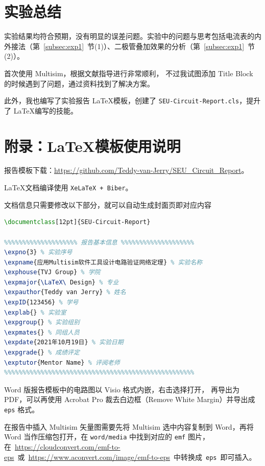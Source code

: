 \documentclass[12pt]{SEU-Circuit-Report}
\begin{document}
    \newpage

    \section{实验总结}

        实验结果均符合预期，没有明显的误差问题。实验中的问题与思考包括电流表的内外接法（第~\ref{subsec:exp1}~节(1)）、二极管叠加效果的分析（第~\ref{subsec:exp1}~节(2)）。

        首次使用 Multisim，根据文献\cite{teaching_schedule}指导进行非常顺利，
        不过我试图添加 Title Block 的时候遇到了问题，通过资料\cite{multisim_help}找到了解决方案。

        此外，我也编写了实验报告 \LaTeX 模板，创建了 \texttt{SEU-Circuit-Report.cls}，提升了 \LaTeX 编写的技能。

    \printbibliography

    \newpage

    \section*{附录：\LaTeX 模板使用说明}

        报告模板下载：\url{https://github.com/Teddy-van-Jerry/SEU_Circuit_Report}。

        \LaTeX 文档编译使用 \texttt{XeLaTeX + Biber}。

        文档信息只需要修改以下部分，就可以自动生成封面页即对应内容

        \begin{lstlisting}[language=TeX]
%% 使用实验报告模板类（字体大小 12pt 最适合）
\documentclass[12pt]{SEU-Circuit-Report}

%%%%%%%%%%%%%%%%%%%% 报告基本信息 %%%%%%%%%%%%%%%%%%%%
\expno{3} % 实验序号
\expname{应用Multisim软件工具设计电路验证网络定理} % 实验名称
\exphouse{TVJ Group} % 学院
\expmajor{\LaTeX\ Design} % 专业
\expauthor{Teddy van Jerry} % 姓名
\expID{123456} % 学号
\explab{} % 实验室
\expgroup{} % 实验组别
\expmates{} % 同组人员
\expdate{2021年10月19日} % 实验日期
\expgrade{} % 成绩评定
\exptutor{Mentor Name} % 评阅老师
%%%%%%%%%%%%%%%%%%%%%%%%%%%%%%%%%%%%%%%%%%%%%%%%%%%%
        \end{lstlisting}

        Word 版报告模板中的电路图以 Visio 格式内嵌，右击选择打开，
        再导出为 PDF，可以再使用 Acrobat Pro 裁去白边框（Remove White Margin）并导出成 \texttt{eps} 格式。

        在报告中插入 Multisim 矢量图需要先将 Multisim 选中内容复制到 Word，再将 Word 当作压缩包打开，在 \texttt{word/media} 中找到对应的 \texttt{emf} 图片，在~\url{https://cloudconvert.com/emf-to-eps}~或~\url{https://www.aconvert.com/image/emf-to-eps}~中转换成~\texttt{eps}~即可插入。
\end{document}
